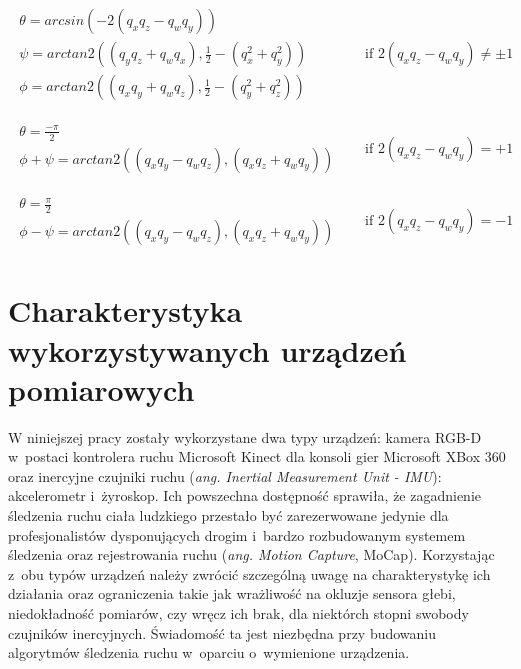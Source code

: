 \begin{equation}	
	\label{eq:appx:rot:quatToEuler}
	\begin{matrix}
		\begin{matrix}                                                   
		\theta = arcsin(-2(q_x q_z-q_w q_y))                             \\
		\psi = arctan2((q_y q_z + q_w q_x), \frac{1}{2}-(q_x^2 + q_y^2)) \\
		\phi = arctan2((q_x q_y + q_w q_z), \frac{1}{2}-(q_y^2 + q_z^2)) 
	\end{matrix} & \quad \text{if } 2(q_x q_z-q_w q_y) \ne \pm 1 \\
	& \\	
	& \\
	\begin{matrix}
		\theta = \frac{-\pi}{2}                                         \\
		\phi + \psi = arctan2((q_x q_y - q_w q_z), (q_x q_z + q_w q_y)) 
	\end{matrix} & \quad \text{if } 2(q_x q_z-q_w q_y) = +1 \\
	& \\	
	& \\
	\begin{matrix}
		\theta = \frac{\pi}{2}                                          \\
		\phi - \psi = arctan2((q_x q_y - q_w q_z), (q_x q_z + q_w q_y)) 
	\end{matrix} & \quad \text{if } 2(q_x q_z-q_w q_y) = -1 
	\end{matrix}
\end{equation}
																													
\section{Charakterystyka wykorzystywanych urządzeń pomiarowych}\label{chap:characteristics}
W niniejszej pracy zostały wykorzystane dwa typy urządzeń: kamera RGB-D w~postaci kontrolera ruchu Microsoft Kinect dla konsoli gier Microsoft XBox 360 oraz inercyjne czujniki ruchu (\emph{ang. Inertial Measurement Unit - IMU}): akcelerometr i~żyroskop. Ich powszechna dostępność sprawiła, że zagadnienie śledzenia ruchu ciała ludzkiego przestało być zarezerwowane jedynie dla profesjonalistów dysponujących drogim i~bardzo rozbudowanym systemem śledzenia oraz rejestrowania ruchu (\emph{ang. Motion Capture}, MoCap). Korzystając z~obu typów urządzeń należy zwrócić szczególną uwagę na charakterystykę ich działania oraz ograniczenia takie jak wrażliwość na okluzje sensora głebi, niedokładność pomiarów, czy wręcz ich brak, dla niektórch stopni swobody czujników inercyjnych. Świadomość ta jest niezbędna przy budowaniu algorytmów śledzenia ruchu w~oparciu o~wymienione urządzenia. 
																													
